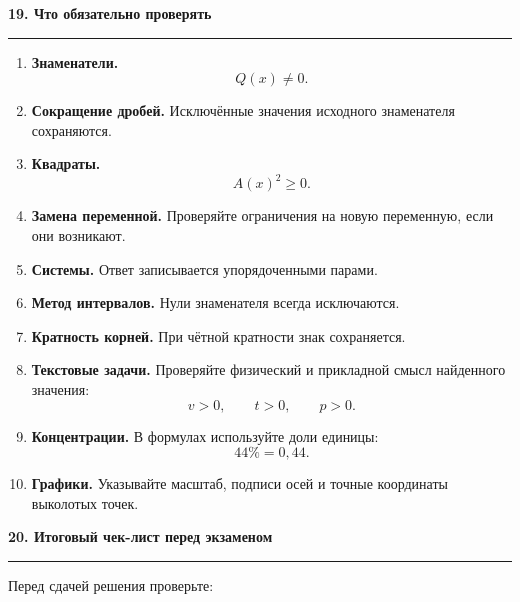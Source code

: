 \documentclass[a4paper,12pt]{article}
\newcommand{\topic}[1]{%
    \vspace{0.5em}
    {\Large\bfseries\textcolor{darkaccent}{#1}}\par
    \vspace{0.2em}
    {\color{accent}\rule{\linewidth}{0.7pt}}
    \vspace{0.5em}
}
\begin{document}
\topic{19. Что обязательно проверять}

\begin{enumerate}
    \item \textbf{Знаменатели.}
    \[
    Q(x)\ne0.
    \]

    \item \textbf{Сокращение дробей.}
    Исключённые значения исходного знаменателя сохраняются.

    \item \textbf{Квадраты.}
    \[
    A(x)^2\ge0.
    \]

    \item \textbf{Замена переменной.}
    Проверяйте ограничения на новую переменную, если они возникают.

    \item \textbf{Системы.}
    Ответ записывается упорядоченными парами.

    \item \textbf{Метод интервалов.}
    Нули знаменателя всегда исключаются.

    \item \textbf{Кратность корней.}
    При чётной кратности знак сохраняется.

    \item \textbf{Текстовые задачи.}
    Проверяйте физический и прикладной смысл найденного значения:
    \[
    v>0,\qquad t>0,\qquad p>0.
    \]

    \item \textbf{Концентрации.}
    В формулах используйте доли единицы:
    \[
    44\%=0{,}44.
    \]

    \item \textbf{Графики.}
    Указывайте масштаб, подписи осей и точные координаты выколотых точек.
\end{enumerate}


\topic{20. Итоговый чек-лист перед экзаменом}

Перед сдачей решения проверьте:
\end{document}
